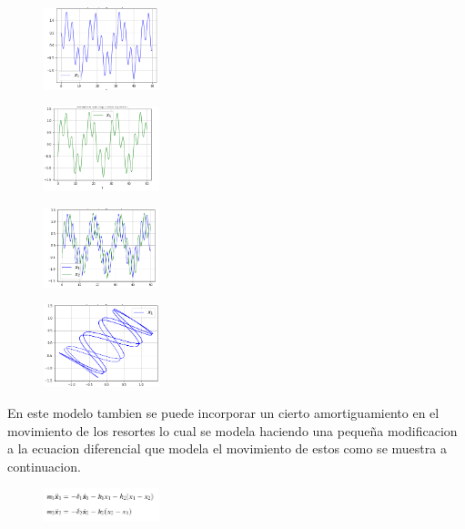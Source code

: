 \documentclass[a4paper]{article}
\begin{document}
\begin{figure}[ht!]
\centering
\includegraphics[width=0.3\textwidth]{2_3_3.png}
\end{figure}

\begin{figure}[ht!]
\centering
\includegraphics[width=0.3\textwidth]{2_3_4.png}
\end{figure}

\begin{figure}[ht!]
\centering
\includegraphics[width=0.3\textwidth]{2_3_5.png}
\end{figure}

\begin{figure}[ht!]
\centering
\includegraphics[width=0.3\textwidth]{2_3_6.png}
\end{figure}

\newpage

En este modelo tambien se puede incorporar un cierto amortiguamiento en el movimiento de los resortes lo cual se modela haciendo una pequeña modificacion a la ecuacion diferencial que modela el movimiento de estos como se muestra a continuacion.

\begin{figure}[ht!]
\centering
\includegraphics[width=0.3\textwidth]{E2.png}
\end{figure}
\end{document}
